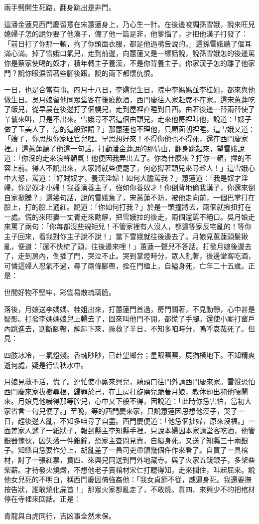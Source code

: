 兩手劈開生死路，翻身跳出是非門。

這潘金蓮見西門慶留意在宋蕙蓮身上，乃心生一計。在後邊唆調孫雪娥，說來旺兒媳婦子怎的說你要了他漢子，備了他一篇是非，他爹惱了，才把他漢子打發了： 「前日打了你那一頓，拘了你頭面衣服，都是他過嘴告說的。」這孫雪娥聽了個耳滿心滿。掉了雪娥口氣兒，走到前邊，向蕙蓮又是一樣話說，說孫雪娥怎的後邊罵你是蔡家使喝的奴才，積年轉主子養漢，不是你背養主子，你家漢子怎的離了他家門？說你眼淚留著些腳後跟。說的兩下都懷仇恨。

一日，也是合當有事。四月十八日，李嬌兒生日，院中李媽媽並李桂姐，都來與他做生日。吳月娘留他同眾堂客在後廳飲酒，西門慶往人家赴席不在家。這宋蕙蓮吃了飯兒，從早晨在後邊打了個幌兒，走到屋裡直睡到日西。由著後邊一替兩替使了丫鬟來叫，只是不出來。雪娥尋不著這個由頭兒，走來他房裡叫他，說道：「嫂子做了玉美人了，怎的這般難請？」那蕙蓮也不理他，只顧面朝裡睡。這雪娥又道：「嫂子，你思想你家旺官兒哩。早思想好來！不得你他也不得死，還在西門慶家裡。」這蕙蓮聽了他這一句話，打動潘金蓮說的那情由，翻身跳起來，望雪娥說道：「你沒的走來浪聲顙氣！他便因我弄出去了。你為什麼來？打你一頓，攆的不容上前。得人不說出來，大家將就些便罷了，何必撐著頭兒來尋趁人！」這雪娥心中大怒，罵道：「好賊奴才，養漢淫婦！如何大膽罵我？」蕙蓮道：「我是奴才淫婦，你是奴才小婦！我養漢養主子，強如你養奴才！你倒背地偷我漢子，你還來倒自家掀騰？」這幾句話，說的雪娥急了，宋蕙蓮不防，被他走向前，一個巴掌打在臉上，打的臉上通紅。說道：「你如何打我？」於是一頭撞將去，兩個就揪扭打在一處。慌的來昭妻一丈青走來勸解，把雪娥拉的後走，兩個還罵不絕口。吳月娘走來罵了兩句：「你每都沒些規矩兒！不管家裡有人沒人，都這等家反宅亂的！等你主子回來，看我對你主子說不說！」當下雪娥就往後邊去了。月娘見蕙蓮頭髮揪亂，便道：「還不快梳了頭，往後邊來哩！」蕙蓮一聲兒不答話。打發月娘後邊去了，走到房內，倒插了門，哭泣不止。哭到掌燈時分，眾人亂著，後邊堂客吃酒，可憐這婦人忍氣不過，尋了兩條腳帶，拴在門楹上，自縊身死，亡年二十五歲。正是：

世間好物不堅牢，彩雲易散琉璃脆。

落後，月娘送李媽媽、桂姐出來，打蕙蓮門首過，房門關著，不見動靜，心中甚是疑影。打發李媽媽娘兒上轎去了，回來叫他門不開，都慌了手腳。還使小廝打窗戶內跳進去，割斷腳帶，解卸下來，撅救了半日，不知多咱時分，嗚呼哀哉死了。但見：

四肢冰冷，一氣燈殘。香魂眇眇，已赴望鄉台；星眼瞑瞑，屍猶橫地下。不知精爽逝何處，疑是行雲秋水中。

月娘見救不活，慌了。連忙使小廝來興兒，騎頭口往門外請西門慶來家。雪娥恐怕西門慶來家拔樹尋根，歸罪於己，在上房打旋磨兒跪著月娘，教休題出和他嚷鬧來。月娘見他嚇得那等腔兒，心中又下般不得，因說道：「此時你恁害怕，當初大家省言一句兒便了。」至晚，等的西門慶來家，只說蕙蓮因思想他漢子，哭了一日，趕後邊人亂，不知多咱尋了自盡。西門慶便道：「他恁個拙婦，原來沒福。」一面差家人遞了一紙狀子，報到縣主李知縣手裡，只說本婦因本家請堂客吃酒，他管銀器傢伙，因失落一件銀鐘，恐家主查問見責，自縊身死。又送了知縣三十兩銀子。知縣自恁要作分上，胡亂差了一員司吏帶領幾個仵作來看了。自買了一具棺材，討了一張紅票，賁四、來興兒同送到門外地藏寺。與了火家五錢銀子，多架些柴薪。才待發火燒燬，不想他老子賣棺材宋仁打聽得知，走來攔住，叫起屈來。說他女兒死的不明白，稱西門慶因倚強姦他：「我女貞節不從，威逼身死。我還要撫按告狀，誰敢燒化屍首！」那眾火家都亂走了，不敢燒。賁四、來興少不的把棺材停在寺裡來回話。正是：

青龍與白虎同行，吉凶事全然未保。

